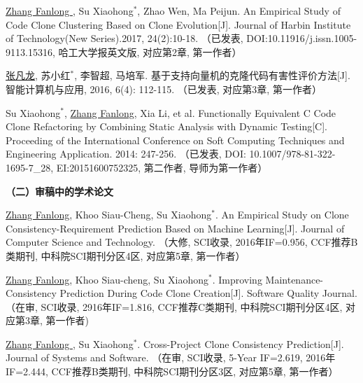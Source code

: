 \begin{publist}
\item
\underline{Zhang Fanlong }, Su Xiaohong{$^*$},  Zhao Wen,  Ma Peijun. An Empirical Study of Code Clone Clustering Based on Clone Evolution[J]. Journal of Harbin Institute of Technology(New Series).2017, 24(2):10-18.
（已发表, DOI:10.11916/j.issn.1005-9113.15316, 哈工大学报英文版, 对应第2章, 第一作者）

\item
\underline{张凡龙}, 苏小红{$^*$},  李智超,  马培军. 基于支持向量机的克隆代码有害性评价方法[J]. 智能计算机与应用, 2016, 6(4): 112-115. 
（已发表, 对应第3章, 第一作者）

\item
Su Xiaohong{$^*$}, \underline{Zhang Fanlong},  Xia Li, et al. Functionally Equivalent C Code Clone Refactoring by Combining Static Analysis with Dynamic Testing[C]. Proceeding of the International Conference on Soft Computing Techniques and Engineering Application. 2014: 247-256.
（已发表, DOI: 10.1007/978-81-322-1695-7\_28, EI:20151600752325, 第二作者, 导师为第一作者）
\end{publist}

\noindent\textbf{（二）审稿中的学术论文}
\begin{publist}

\item
\underline{Zhang Fanlong},  Khoo Siau-Cheng, Su Xiaohong{$^*$}. An Empirical Study on Clone Consistency-Requirement Prediction Based on Machine Learning[J]. Journal of Computer Science and Technology.
（大修, SCI收录, 2016年IF=0.956, CCF推荐B类期刊, 中科院SCI期刊分区4区, 对应第5章, 第一作者）

\item
\underline{Zhang Fanlong}, Khoo Siau-cheng, Su Xiaohong{$^*$}. Improving Maintenance-Consistency Prediction During Code Clone Creation[J]. Software Quality Journal. 
（在审, SCI收录, 2916年IF=1.816, CCF推荐C类期刊, 中科院SCI期刊分区4区, 对应第3章, 第一作者)

\item
\underline{Zhang Fanlong }, Su Xiaohong{$^*$}. Cross-Project Clone Consistency Prediction[J]. Journal of Systems and Software.
（在审, SCI收录, 5-Year IF=2.619, 2016年IF=2.444, CCF推荐B类期刊, 中科院SCI期刊分区3区, 对应第5章, 第一作者）



\end{publist}

